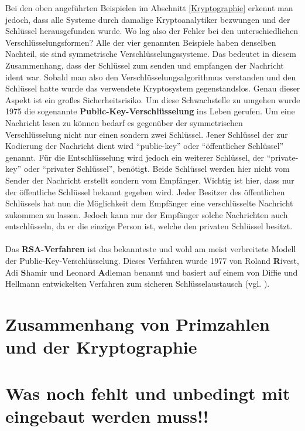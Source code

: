 \documentclass[german,12pt,a4paper]{article}
\begin{document}
Bei den oben angeführten Beispielen im Abschnitt \ref{Kryptographie} erkennt man jedoch, dass alle Systeme durch damalige Kryptoanalytiker bezwungen und der Schlüssel herausgefunden wurde.
Wo lag also der Fehler bei den unterschiedlichen Verschlüsselungsformen?
Alle der vier genannten Beispiele haben denselben Nachteil, sie sind symmetrische Verschlüsselungssysteme.
Das bedeutet in diesem Zusammenhang, dass der Schlüssel zum senden und empfangen der Nachricht ident war.
Sobald man also den Verschlüsselungsalgorithmus verstanden und den Schlüssel hatte wurde das verwendete Kryptosystem gegenstandslos.
Genau dieser Aspekt ist ein großes Sicherheitsrisiko.
Um diese Schwachstelle zu umgehen wurde 1975 die sogenannte \textbf{Public-Key-Verschlüsselung} ins Leben gerufen.
Um eine Nachricht lesen zu können bedarf es gegenüber der symmetrischen Verschlüsselung nicht nur einen sondern zwei Schlüssel.
Jener Schlüssel der zur Kodierung der Nachricht dient wird “public-key” oder “öffentlicher Schlüssel” genannt.
Für die Entschlüsselung wird jedoch ein weiterer Schlüssel, der “private-key” oder “privater Schlüssel”, benötigt.
Beide Schlüssel werden hier nicht vom Sender der Nachricht erstellt sondern vom Empfänger.
Wichtig ist hier, dass nur der öffentliche Schlüssel bekannt gegeben wird.
Jeder Besitzer des öffentlichen Schlüssels hat nun die Möglichkeit dem Empfänger eine verschlüsselte Nachricht zukommen zu lassen.
Jedoch kann nur der Empfänger solche Nachrichten auch entschlüsseln, da er die einzige Person ist, welche den privaten Schlüssel besitzt.\\\\
Das \textbf{RSA-Verfahren} ist das bekannteste und wohl am meist verbreitete Modell der Public-Key-Verschlüsselung.
Dieses Verfahren wurde 1977 von Roland \textbf{R}ivest, Adi \textbf{S}hamir und Leonard \textbf{A}dleman benannt und basiert auf einem von Diffie und Hellmann entwickelten Verfahren zum sicheren Schlüsselaustausch (vgl. \cite[105]{RempeGillen2009}).

\section{Zusammenhang von Primzahlen und der Kryptographie}\label{Zusammenhang von Primzahlen und der Kryptographie}

\newpage

\section{Was noch fehlt und unbedingt mit eingebaut werden muss!!}
\end{document}
